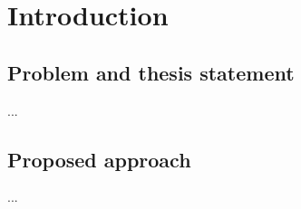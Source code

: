 \chapter{Introduction}
\label{cha:introduction}

\section{Problem and thesis statement}
\label{sec:problem}

...


\section{Proposed approach}
\label{sec:proposedapproach}

...


